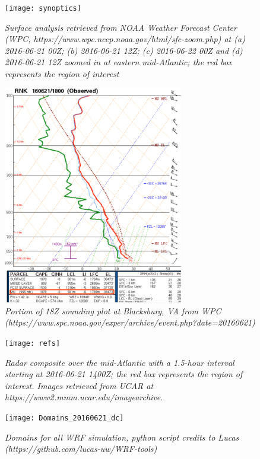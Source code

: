 \begin{figure}[H]
\centering
\texttt{[image: synoptics]}
\singlespacing
\caption{\textit{Surface analysis retrieved from NOAA Weather Forecast Center (WPC, https://www.wpc.ncep.noaa.gov/html/sfc-zoom.php) at (a) 2016-06-21 00Z; (b) 2016-06-21 12Z; (c) 2016-06-22 00Z and (d) 2016-06-21 12Z zoomed in at eastern mid-Atlantic; the red box represents the region of interest}}
\label{fig:synoptics}
\end{figure}

\begin{figure}[H]
\centering
\includegraphics[width=0.7\textwidth]{sounding}
\singlespacing
\caption{\textit{Portion of 18Z sounding plot at Blacksburg, VA from WPC (https://www.spc.noaa.gov/exper/archive/event.php?date=20160621)}}
\label{fig:sounding}
\end{figure}

\begin{figure}[H]
\centering
\texttt{[image: refs]}
\singlespacing
\caption{\textit{Radar composite over the mid-Atlantic with a 1.5-hour interval starting at 2016-06-21 1400Z; the red box represents the region of interest.  Images retrieved from UCAR at https://www2.mmm.ucar.edu/imagearchive}.}
\label{fig:refs}
\end{figure}

\begin{figure}[H]
\centering
\texttt{[image: Domains\_20160621\_dc]}
\singlespacing
\caption{\textit{Domains for all WRF simulation, python script credits to Lucas (https://github.com/lucas-uw/WRF-tools)}}
\label{fig:Domain_2s_20160621_dc}
\end{figure}

